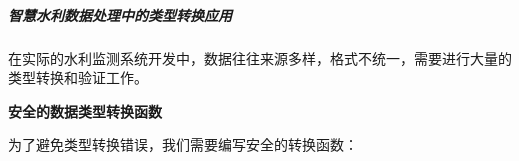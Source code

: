 \begin{Shaded}
\begin{Highlighting}[]
\NormalTok{ (}\NormalTok{) \{}
    \NormalTok{(}\NormalTok{)}\OperatorTok{;} 
\NormalTok{\}}

\NormalTok{ (}\NormalTok{) \{}
    \NormalTok{(}\NormalTok{)}\OperatorTok{;}   
\NormalTok{\}}

\NormalTok{(} \OperatorTok{\&\&} \NormalTok{)}\OperatorTok{;}      
\NormalTok{(} \OperatorTok{\&\&} \NormalTok{)}\OperatorTok{;}    
\NormalTok{(} \OperatorTok{||} \NormalTok{)}\OperatorTok{;}      
\end{Highlighting}
\end{Shaded}

\subparagraph{智慧水利数据处理中的类型转换应用}\label{ux667aux6167ux6c34ux5229ux6570ux636eux5904ux7406ux4e2dux7684ux7c7bux578bux8f6cux6362ux5e94ux7528}

在实际的水利监测系统开发中，数据往往来源多样，格式不统一，需要进行大量的类型转换和验证工作。

\textbf{安全的数据类型转换函数}

为了避免类型转换错误，我们需要编写安全的转换函数：

